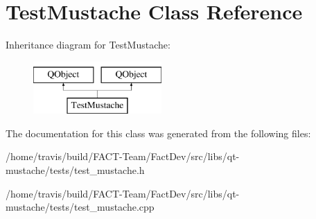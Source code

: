 \hypertarget{classTestMustache}{\section{Test\-Mustache Class Reference}
\label{classTestMustache}
}
Inheritance diagram for Test\-Mustache\-:\begin{figure}[H]
\begin{center}
\leavevmode
\includegraphics[height=2.000000cm]{de/d63/classTestMustache}
\end{center}
\end{figure}


The documentation for this class was generated from the following files\-:\begin{DoxyCompactItemize}
\item 
/home/travis/build/\-F\-A\-C\-T-\/\-Team/\-Fact\-Dev/src/libs/qt-\/mustache/tests/test\-\_\-mustache.\-h\item 
/home/travis/build/\-F\-A\-C\-T-\/\-Team/\-Fact\-Dev/src/libs/qt-\/mustache/tests/test\-\_\-mustache.\-cpp\end{DoxyCompactItemize}
